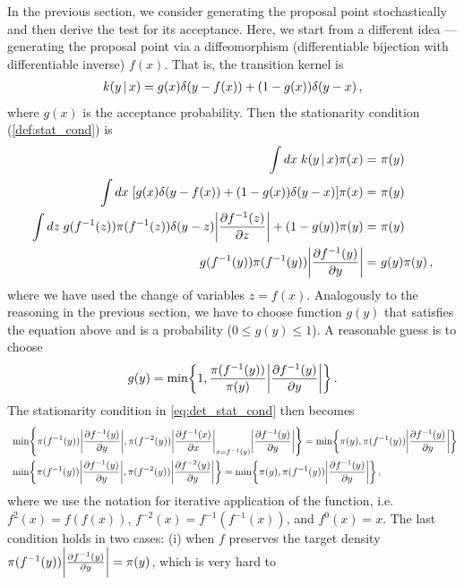 In the previous section, we consider generating the proposal point stochastically and then derive the test for its acceptance. Here, we start from a different idea --- generating the proposal point via a diffeomorphism (differentiable bijection with differentiable inverse) $f(x)$. That is, the transition kernel is
\begin{align}
    k(y\,|\, x) = g(x)\delta(y-f(x)) + (1-g(x))\delta(y-x)\,,
\end{align}
where $g(x)$ is the acceptance probability. Then the stationarity condition (\cref{def:stat_cond}) is
\begin{align}
    \int dx\; k(y\cond x) \pi(x) =~& \pi(y)\\
    \int dx\; \left[g(x)\delta(y-f(x)) + (1-g(x))\delta(y-x)\right]\pi(x) =~& \pi(y)\\
    \int dz\; g(f^{-1}(z))\pi(f^{-1}(z))\delta(y-z)\bigg|\deriv{f^{-1}(z)}{z}\bigg| + (1-g(y))\pi(y) =~& \pi(y)\\
    g(f^{-1}(y))\pi(f^{-1}(y))\bigg|\deriv{f^{-1}(y)}{y}\bigg| =~& g(y)\pi(y)\,,\label{eq:det_stat_cond}
\end{align}
where we have used the change of variables $z = f(x)$. Analogously to the reasoning in the previous section, we have to choose function $g(y)$ that satisfies the equation above and is a probability ($0 \leq g(y) \leq 1$). A reasonable guess is to choose
\begin{align}
    g(y) = \min\left\{1, \frac{\pi(f^{-1}(y))}{\pi(y)}\bigg|\deriv{f^{-1}(y)}{y}\bigg|\right\}\,.
\end{align}
The stationarity condition in \cref{eq:det_stat_cond} then becomes
\begin{align}
    ~&\min\left\{\pi(f^{-1}(y))\bigg|\deriv{f^{-1}(y)}{y}\bigg|, \pi(f^{-2}(y))\bigg|\deriv{f^{-1}(x)}{x}\bigg|_{x=f^{-1}(y)}\bigg|\deriv{f^{-1}(y)}{y}\bigg|\right\} = \min\left\{\pi(y), \pi(f^{-1}(y))\bigg|\deriv{f^{-1}(y)}{y}\bigg|\right\}\nonumber\\
    ~&\min\left\{\pi(f^{-1}(y))\bigg|\deriv{f^{-1}(y)}{y}\bigg|, \pi(f^{-2}(y))\bigg|\deriv{f^{-2}(y)}{y}\bigg|\right\} = \min\left\{\pi(y), \pi(f^{-1}(y))\bigg|\deriv{f^{-1}(y)}{y}\bigg|\right\}\,,\label{eq:det_test}
\end{align}
where we use the notation for iterative application of the function, i.e. $f^2(x) = f(f(x))$, $f^{-2}(x) = f^{-1}(f^{-1}(x))$, and $f^0(x) = x$. The last condition holds in two cases: (i) when $f$ preserves the target density $\pi(f^{-1}(y))\bigg|\frac{\partial f^{-1}(y)}{\partial y}\bigg| = \pi(y)$, which is very hard to 
